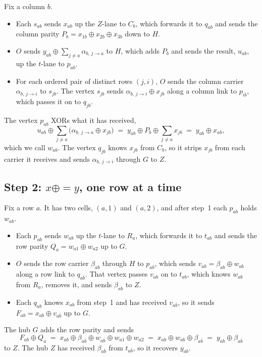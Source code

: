 \documentclass[11pt]{article}
\newcommand{\xeq}{\mathrel{\oplus\!\!=}}
\newcommand{\al}[3]{\alpha_{#1,\,#2\to#3}}
\begin{document}
Fix a column $b$.
\begin{itemize}[nosep]
\item Each $s_{ab}$ sends $x_{ab}$ up the $Z$-lane to $C_b$, which forwards it to $q_{ab}$ and sends the column parity $P_b=x_{1b}\oplus x_{2b}\oplus x_{3b}$ down to $H$.
\item $O$ sends $y_{ab}\oplus\sum_{j\neq a}\al{b}{j}{a}$ to $H$, which adds $P_b$ and sends the result, $u_{ab}$, up the $t$-lane to $p_{ab}$.
\item For each ordered pair of distinct rows $(j,i)$, $O$ sends the column carrier $\al{b}{j}{i}$ to $s_{jb}$. The vertex $s_{jb}$ sends $\al{b}{j}{i}\oplus x_{jb}$ along a column link to $p_{ib}$, which passes it on to $q_{jb}$.
\end{itemize}
The vertex $p_{ab}$ XORs what it has received,
\[
u_{ab}\oplus\sum_{j\neq a}\bigl(\al{b}{j}{a}\oplus x_{jb}\bigr)
\;=\;y_{ab}\oplus P_b\oplus\sum_{j\neq a}x_{jb}
\;=\;y_{ab}\oplus x_{ab},
\]
which we call $w_{ab}$. The vertex $q_{jb}$ knows $x_{jb}$ from $C_b$, so it strips $x_{jb}$ from each carrier it receives and sends $\al{b}{j}{i}$ through $G$ to $Z$.

\subsection{Step 2: \texorpdfstring{$x\xeq y$}{x ^= y}, one row at a time}\label{sec:r2}

Fix a row $a$. It has two cells, $(a,1)$ and $(a,2)$, and after step~1 each $p_{ab}$ holds $w_{ab}$.
\begin{itemize}[nosep]
\item Each $p_{ab}$ sends $w_{ab}$ up the $t$-lane to $R_a$, which forwards it to $t_{ab}$ and sends the row parity $Q_a=w_{a1}\oplus w_{a2}$ up to $G$.
\item $O$ sends the row carrier $\beta_{ab}$ through $H$ to $p_{ab}$, which sends $v_{ab}=\beta_{ab}\oplus w_{ab}$ along a row link to $q_{a\bar b}$. That vertex passes $v_{ab}$ on to $t_{ab}$, which knows $w_{ab}$ from $R_a$, removes it, and sends $\beta_{ab}$ to $Z$.
\item Each $q_{ab}$ knows $x_{ab}$ from step~1 and has received $v_{a\bar b}$, so it sends $F_{ab}=x_{ab}\oplus v_{a\bar b}$ up to $G$.
\end{itemize}
The hub $G$ adds the row parity and sends
\[
F_{ab}\oplus Q_a
\;=\;x_{ab}\oplus\beta_{a\bar b}\oplus w_{a\bar b}\oplus w_{a1}\oplus w_{a2}
\;=\;x_{ab}\oplus w_{ab}\oplus\beta_{a\bar b}
\;=\;y_{ab}\oplus\beta_{a\bar b}
\]
to $Z$. The hub $Z$ has received $\beta_{a\bar b}$ from $t_{a\bar b}$, so it recovers $y_{ab}$.
\end{document}
